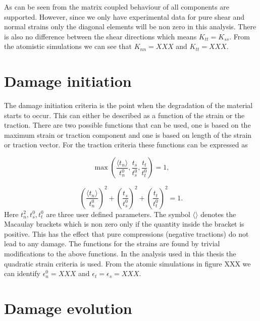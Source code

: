 \documentclass[generate_interface_elements.tex]{subfiles}
\begin{document}
As can be seen from the matrix coupled behaviour of all components are supported. However, since we only have experimental data for pure shear and normal strains only the diagonal elements will be non zero in this analysis. There is also no difference between the shear directions which means $K_{tt} = K_{ss}$. From the atomistic simulations we can see that $K_{nn} = XXX$ and $K_{tt} = XXX$.

 
 

\section{Damage initiation}

The damage initiation criteria is the point when the degradation of the material starts to occur. This can either be described as a function of the strain or the traction. There are two possible functions that can be used, one is based on the maximum strain or traction component and one is based on length of the strain or traction vector. For the traction criteria these functions can be expressed as

\[ \max \left( \frac{\langle t_n \rangle}{t_n^0} ,\frac{ t_s }{t_s^0} ,  \frac{ t_t }{t_t^0}  \right) = 1,  \] 

\[  \left( \frac{\langle t_n \rangle}{t_n^0} \right)^2 +   \left( \frac{ t_s }{t_s^0} \right)^2 +   \left( \frac{ t_t }{t_t^0} \right)^2 = 1.   \]	
%
Here $t_n^2, t_s^0, t_t^0$ are three user defined parameters. The symbol $\langle \rangle$ denotes the Macaulay brackets which is non zero only if the quantity inside the bracket is positive. This has the effect that pure compressions (negative tractions) do not lead to any damage. The functions for the strains are found by trivial modifications to the above functions. In the analysis used in this thesis the quadratic strain criteria is used. From the atomic simulations in figure XXX we can identify $\epsilon_n^0 = XXX$ and $\epsilon_t = \epsilon_s = XXX$.

\section{Damage evolution}
\end{document}
